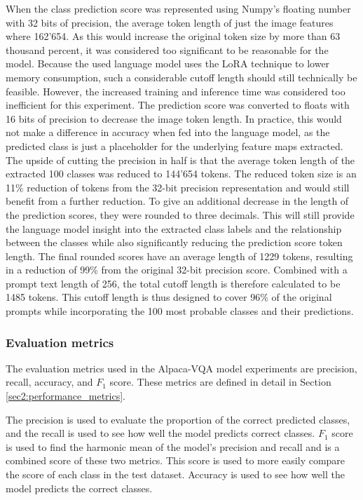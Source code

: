         When the class prediction score was represented using Numpy's floating number with 32 bits of precision, the average token length of just the image features where 162'654. As this would increase the original token size by more than 63 thousand percent, it was considered too significant to be reasonable for the model. Because the used language model uses the LoRA technique to lower memory consumption, such a considerable cutoff length should still technically be feasible. However, the increased training and inference time was considered too inefficient for this experiment.  
        The prediction score was converted to floats with 16 bits of precision to decrease the image token length. In practice, this would not make a difference in accuracy when fed into the language model, as the predicted class is just a placeholder for the underlying feature maps extracted. 
        The upside of cutting the precision in half is that the average token length of the extracted 100 classes was reduced to 144'654 tokens. The reduced token size is an 11\% reduction of tokens from the 32-bit precision representation and would still benefit from a further reduction. 
        To give an additional decrease in the length of the prediction scores, they were rounded to three decimals. This will still provide the language model insight into the extracted class labels and the relationship between the classes while also significantly reducing the prediction score token length. 
        The final rounded scores have an average length of 1229 tokens, resulting in a reduction of 99\% from the original 32-bit precision score. 
        Combined with a prompt text length of 256, the total cutoff length is therefore calculated to be 1485 tokens. 
        This cutoff length is thus designed to cover 96\% of the original prompts while incorporating the 100 most probable classes and their predictions. 

         


        \subsubsection{Evaluation metrics}
        The evaluation metrics used in the Alpaca-VQA model experiments are precision, recall, accuracy, and $F_1$ score. These metrics are defined in detail in Section \ref{sec2:performance_metrics}.
        
        The precision is used to evaluate the proportion of the correct predicted classes, and the recall is used to see how well the model predicts correct classes.
        $F_1$ score is used to find the harmonic mean of the model's precision and recall and is a combined score of these two metrics. This score is used to more easily compare the score of each class in the test dataset. 
        Accuracy is used to see how well the model predicts the correct classes. 
        
